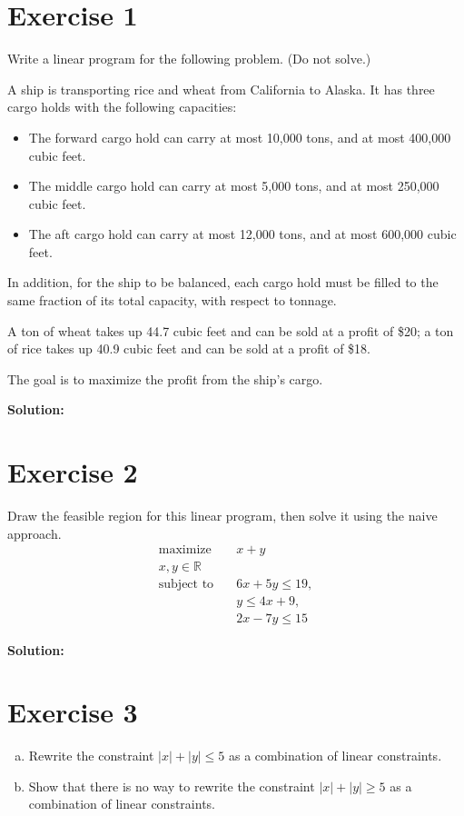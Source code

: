 \documentclass{article}
\begin{document}
\section*{Exercise 1}
Write a linear program for the following problem. (Do not solve.)

A ship is transporting rice and wheat from California to Alaska. It has three cargo holds with the following capacities:
\begin{itemize}
\item The forward cargo hold can carry at most 10,000 tons, and at most 400,000 cubic feet.
\item The middle cargo hold can carry at most 5,000 tons, and at most 250,000 cubic feet.
\item The aft cargo hold can carry at most 12,000 tons, and at most 600,000 cubic feet.
\end{itemize}

In addition, for the ship to be balanced, each cargo hold must be filled to the same fraction of its total capacity, with respect to tonnage.

A ton of wheat takes up 44.7 cubic feet and can be sold at a profit of \$20; a ton of rice takes up 40.9 cubic feet and can be sold at a profit of \$18.

The goal is to maximize the profit from the ship's cargo.

\textbf{Solution: }
\newpage

\section*{Exercise 2}
Draw the feasible region for this linear program, then solve it using the naive approach.
\begin{align*}
\text{maximize} \quad & x + y \\
x,y \in \mathbb{R} \\
\text{subject to} \quad & 6x + 5y \leq 19, \\
& y \leq 4x + 9, \\
& 2x - 7y \leq 15
\end{align*}

\textbf{Solution: }
\newpage

\section*{Exercise 3}
\begin{enumerate}[(a)]
\item Rewrite the constraint $|x| + |y| \leq 5$ as a combination of linear constraints.
\item Show that there is no way to rewrite the constraint $|x| + |y| \geq 5$ as a combination of linear constraints.
\end{enumerate}
\end{document}
